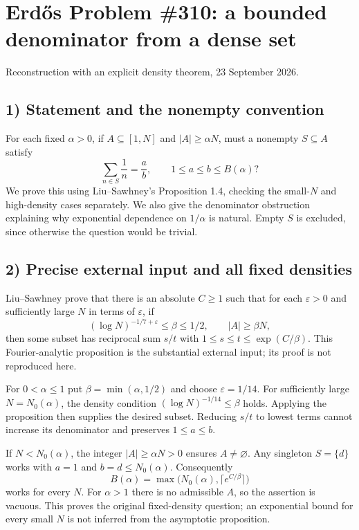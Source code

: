 \section{Erd\H{o}s Problem \#310: a bounded denominator from a dense set}
\noindent Reconstruction with an explicit density theorem, 23 September 2026.

\subsection*{1) Statement and the nonempty convention}
For each fixed $\alpha>0$, if $A\subseteq[1,N]$ and $|A|\ge\alpha N$, must a nonempty $S\subseteq A$ satisfy
\[
 \sum_{n\in S}\frac1n=\frac ab,\qquad1\le a\le b\le B(\alpha)?
\]
We prove this using Liu--Sawhney's Proposition 1.4, checking the small-$N$ and high-density cases separately. We also give the denominator obstruction explaining why exponential dependence on $1/\alpha$ is natural. Empty $S$ is excluded, since otherwise the question would be trivial.

\subsection*{2) Precise external input and all fixed densities}
Liu--Sawhney prove that there is an absolute $C\ge1$ such that for each $\varepsilon>0$ and sufficiently large $N$ in terms of $\varepsilon$, if
\[
 (\log N)^{-1/7+\varepsilon}\le\beta\le1/2,
 \qquad |A|\ge\beta N,
\]
then some subset has reciprocal sum $s/t$ with $1\le s\le t\le\exp(C/\beta)$. This Fourier-analytic proposition is the substantial external input; its proof is not reproduced here.

For $0<\alpha\le1$ put $\beta=\min(\alpha,1/2)$ and choose $\varepsilon=1/14$. For sufficiently large $N=N_0(\alpha)$, the density condition $(\log N)^{-1/14}\le\beta$ holds. Applying the proposition then supplies the desired subset. Reducing $s/t$ to lowest terms cannot increase its denominator and preserves $1\le a\le b$.

If $N<N_0(\alpha)$, the integer $|A|\ge\alpha N>0$ ensures $A\ne\varnothing$. Any singleton $S=\{d\}$ works with $a=1$ and $b=d\le N_0(\alpha)$. Consequently
\[
 B(\alpha)=\max\bigl(N_0(\alpha),\lceil e^{C/\beta}\rceil\bigr)
\]
works for every $N$. For $\alpha>1$ there is no admissible $A$, so the assertion is vacuous. This proves the original fixed-density question; an exponential bound for every small $N$ is not inferred from the asymptotic proposition.

